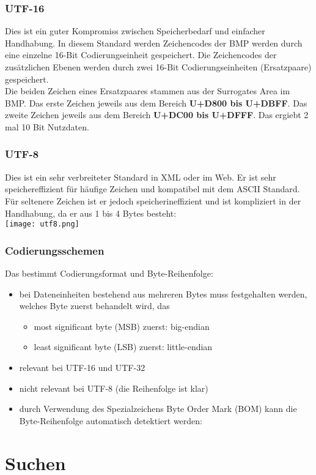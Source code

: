 \documentclass[a4paper,10pt]{article}
\newcommand{\Bold}[1]{\textbf{#1}} %
\begin{document}
\subsubsection{UTF-16}
Dies ist ein guter Kompromiss zwischen Speicherbedarf und einfacher Handhabung. In diesem Standard werden Zeichencodes der BMP werden durch eine einzelne 16-Bit Codierungseinheit gespeichert. Die Zeichencodes der zus\"atzlichen Ebenen werden durch zwei 16-Bit Codierungseinheiten (Ersatzpaare) gespeichert. \\
Die beiden Zeichen eines Ersatzpaares stammen aus der Surrogates Area im BMP. Das erste Zeichen jeweils aus dem Bereich \Bold {U+D800 bis U+DBFF}. Das zweite Zeichen jeweils aus dem Bereich \Bold {U+DC00 bis U+DFFF}. Das ergiebt 2 mal 10 Bit Nutzdaten.

\subsubsection{UTF-8}
Dies ist ein sehr verbreiteter Standard in XML oder im Web. Er ist sehr speichereffizient f\"ur h\"aufige Zeichen und kompatibel mit dem ASCII Standard. F\"ur seltenere Zeichen ist er jedoch speicherineffizient und ist kompliziert in der Handhabung, da er aus 1 bis 4 Bytes besteht: \\
\texttt{[image: utf8.png]}

\subsubsection{Codierungsschemen}
Das bestimmt Codierungsformat und Byte-Reihenfolge:
\begin{itemize}
	\item bei Dateneinheiten bestehend aus mehreren Bytes muss festgehalten werden, welches Byte zuerst behandelt wird, das
		\begin{itemize}
			\item most significant byte (MSB) zuerst: big-endian
			\item least significant byte (LSB) zuerst: little-endian
 		\end{itemize}		 
 	\item relevant bei UTF-16 und UTF-32
 	\item nicht relevant bei UTF-8 (die Reihenfolge ist klar)
 	\item durch Verwendung des Spezialzeichens Byte Order Mark (BOM) kann die Byte-Reihenfolge automatisch detektiert werden:
\end{itemize}
\newpage
\section{Suchen}
\end{document}
